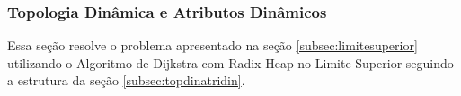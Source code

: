 \subsubsection{Topologia Dinâmica e Atributos Dinâmicos}
Essa seção resolve o problema apresentado na seção \ref{subsec:limitesuperior} utilizando o Algoritmo de
Dijkstra com Radix Heap no Limite Superior seguindo a estrutura da seção \ref{subsec:topdinatridin}.




























